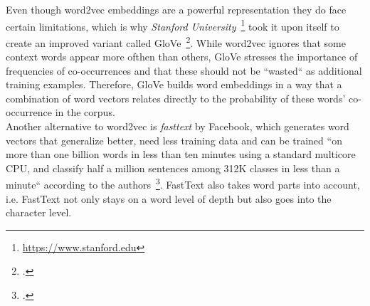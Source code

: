 Even though word2vec embeddings are a powerful representation they do face certain limitations, which is why \textit{Stanford University}~\footnote{\url{https://www.stanford.edu}} took it upon itself to create an improved variant called GloVe~\footcite{pennington-etal-2014-glove}. While word2vec ignores that some context words appear more ofthen than others, GloVe stresses the importance of frequencies of co-occurrences and that these should not be “wasted“ as additional training examples. Therefore, GloVe builds word embeddings in a way that a combination of word vectors relates directly to the probability of these words' co-occurrence in the corpus. \\
Another alternative to word2vec is \textit{fasttext} by Facebook, which generates word vectors that generalize better, need less training data and can be trained “on more than one billion words in less than ten minutes using a standard multicore CPU, and classify half a million sentences among 312K classes in less than a minute“ according to the authors~\footcite{DBLP:journals/corr/JoulinGBM16}. FastText also takes word parts into account, i.e. FastText not only stays on a word level of depth but also goes into the character level.










